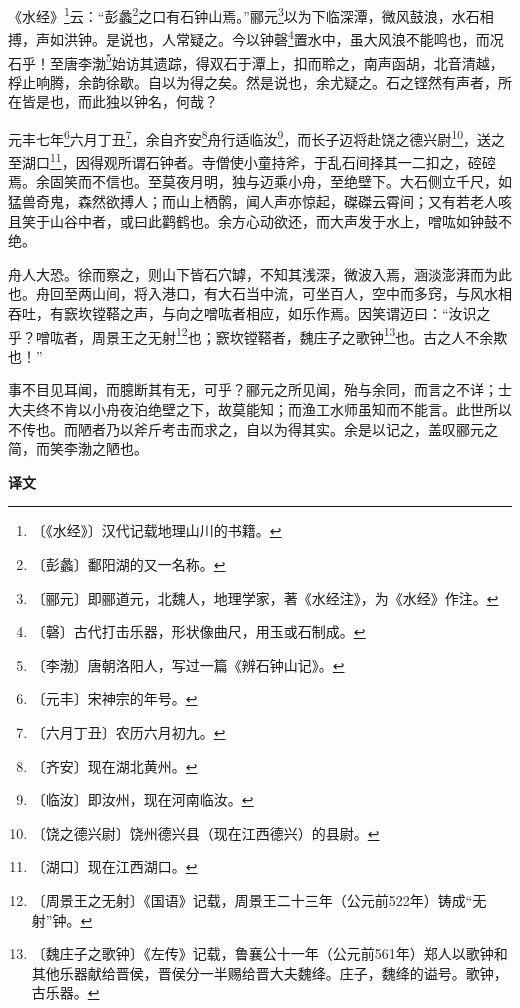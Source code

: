 \documentclass[12pt,UTF-8,openany,a4]{ctexbook}
\begin{document}
\begin{large}
    
    《水经》\footnote{〔《水经》〕\yiwen 汉代记载地理山川的书籍。}云：“彭蠡\footnote{〔彭蠡〕\yiwen 鄱阳湖的又一名称。}之口有石钟山焉。”郦元\footnote{〔郦元〕\yiwen 即郦道元，北魏人，地理学家，著《水经注》，为《水经》作注。}以为下临深潭，微风鼓浪，水石相搏，声如洪钟。是说也，人常疑之。今以钟磬\footnote{〔磬〕\yiwen 古代打击乐器，形状像曲尺，用玉或石制成。}置水中，虽大风浪不能鸣也，而况石乎！至唐李渤\footnote{〔李渤〕\yiwen 唐朝洛阳人，写过一篇《辨石钟山记》。}始访其遗踪，得双石于潭上，扣而聆之，南声函胡，北音清越，桴止响腾，余韵徐歇。自以为得之矣。然是说也，余尤疑之。石之铿然有声者，所在皆是也，而此独以钟名，何哉？
    
    元丰七年\footnote{〔元丰〕\yiwen 宋神宗的年号。}六月丁丑\footnote{〔六月丁丑〕\yiwen 农历六月初九。}，余自齐安\footnote{〔齐安〕\yiwen 现在湖北黄州。}舟行适临汝\footnote{〔临汝〕\yiwen 即汝州，现在河南临汝。}，而长子迈将赴饶之德兴尉\footnote{〔饶之德兴尉〕\yiwen 饶州德兴县（现在江西德兴）的县尉。}，送之至湖口\footnote{〔湖口〕\yiwen 现在江西湖口。}，因得观所谓石钟者。寺僧使小童持斧，于乱石间择其一二扣之，硿硿焉。余固笑而不信也。至莫夜月明，独与迈乘小舟，至绝壁下。大石侧立千尺，如猛兽奇鬼，森然欲搏人；而山上栖鹘，闻人声亦惊起，磔磔云霄间；又有若老人咳且笑于山谷中者，或曰此鹳鹤也。余方心动欲还，而大声发于水上，噌吰如钟鼓不绝。
    
    舟人大恐。徐而察之，则山下皆石穴罅，不知其浅深，微波入焉，涵淡澎湃而为此也。舟回至两山间，将入港口，有大石当中流，可坐百人，空中而多窍，与风水相吞吐，有窾坎镗鞳之声，与向之噌吰者相应，如乐作焉。因笑谓迈曰：“汝识之乎？噌吰者，周景王之无射\footnote{〔周景王之无射〕\yiwen 《国语》记载，周景王二十三年（公元前522年）铸成“无射”钟。}也；窾坎镗鞳者，魏庄子之歌钟\footnote{〔魏庄子之歌钟〕\yiwen 《左传》记载，鲁襄公十一年（公元前561年）郑人以歌钟和其他乐器献给晋侯，晋侯分一半赐给晋大夫魏绛。庄子，魏绛的谥号。歌钟，古乐器。}也。古之人不余欺也！”
    
    事不目见耳闻，而臆断其有无，可乎？郦元之所见闻，殆与余同，而言之不详；士大夫终不肯以小舟夜泊绝壁之下，故莫能知；而渔工水师虽知而不能言。此世所以不传也。而陋者乃以斧斤考击而求之，自以为得其实。余是以记之，盖叹郦元之简，而笑李渤之陋也。
\end{large}


\newpage

\begin{Large}
    \noindent\textbf{译文}
\end{Large}


\vspace{1em}
\end{document}
